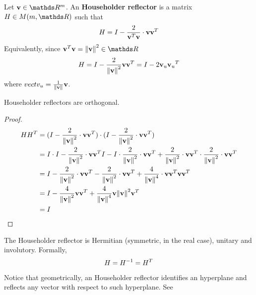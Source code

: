 \documentclass[computationalMathematics.tex]{subfiles}
\begin{document}
\begin{definition}
  Let $\vect{v} \in \R^m$.
  An \textbf{Householder reflector} is a matrix $H \in M(m, \R)$ such that
  \[
  	H = I - \frac{2}{{{\bf v }}^{T}{\bf v }} \cdot {\bf v } {{\bf v }}^{T}
  \]
  Equivalently, since $\tr{\vect{v}}\vect{v} = \sqrnorm{\vect{v}} \in \R$
  \[
  	H = I - \frac{2}{{\left\lVert{\bf v }\right\rVert}^2} {\bf v } {{\bf v }}^{T} = I - 2{\bf v }_u {{\bf v }_u}^{T} 
  \]
  where $vect{v}_u = \frac{1}{\left\lVert{\bf v }\right\rVert}{\bf v }$.
\end{definition}

\begin{lemma}
  Householder reflectors are orthogonal.
\end{lemma}

\begin{proof}
  \begin{equation}
    \begin{split}
      H{H}^{T} & = (I-\frac{2}{{\|{\bf v }\|}^{2}} \cdot {\bf v } {{\bf v }}^{T}) \cdot (I-\frac{2}{{\|{\bf v }\|}^{2}} \cdot {\bf v } {{\bf v }}^{T})\\
      & = I\cdot I - \frac{2}{{\left\lVert{\bf v }\right\rVert}^2} \cdot {\bf v } {{\bf v }}^{T} I-I \cdot \frac{2}{{\left\lVert{\bf v }\right\rVert}^2} \cdot {\bf v } {{\bf v }}^{T} + \frac{2}{{\left\lVert{\bf v }\right\rVert}^2} \cdot {\bf v } {{\bf v }}^{T} \cdot \frac{2}{{\left\lVert{\bf v }\right\rVert}^2} \cdot {\bf v } {{\bf v }}^{T}\\
      & = I - \frac{2}{{\left\lVert{\bf v }\right\rVert}^2} \cdot {\bf v } {{\bf v }}^{T} - \frac{2}{{\left\lVert{\bf v }\right\rVert}^2} \cdot {\bf v } {{\bf v }}^{T} + \frac{4}{{\|{\bf v }\|}^{4}} \cdot {\bf v }{{\bf v }}^{T} {\bf v } {{\bf v }}^{T}\\
      & = I - \frac{4}{{\left\lVert{\bf v }\right\rVert}^2} {\bf v } {{\bf v }}^{T} + \frac{4}{{\|{\bf v }\|}^{4}} {\bf v } {\|{\bf v }\|}^{2} {{\bf v }}^{T}\\
      & = I
    \end{split}
  \end{equation}
\end{proof}

\begin{corollary}
	The Householder reflector is Hermitian (symmetric, in the real case), unitary and involutory.
	Formally,
	\[
		H = {H}^{-1} = {H}^{T}
	\]
\end{corollary}

Notice that geometrically, an Householder reflector identifies an hyperplane and reflects any vector with respect to such hyperplane. See 
\end{document}
